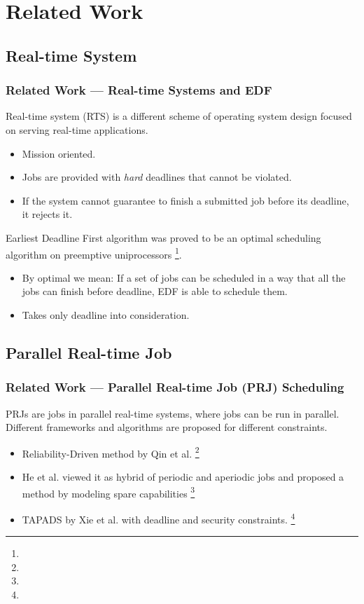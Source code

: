 \section{Related Work}
\subsection{Real-time System}
\begin{frame}
  \frametitle{Related Work --- Real-time Systems and EDF}
  Real-time system (RTS) is a different scheme of operating system
  design focused on serving real-time applications.
  \begin{itemize}
    \item Mission oriented.
    \item Jobs are provided with {\emph{hard}} deadlines that cannot be violated.
    \item If the system cannot guarantee to finish a submitted job
      before its deadline, it rejects it.
  \end{itemize}

  Earliest Deadline First algorithm was proved to be an optimal
  scheduling algorithm on preemptive uniprocessors
  \footnote[frame]{\tiny{}}.
  \begin{itemize}
    \item By optimal we mean: If a set of jobs can be scheduled in a way that all the jobs
      can finish before deadline, EDF is able to schedule them.
    \item Takes only deadline into consideration.
  \end{itemize}
\end{frame}
\subsection{Parallel Real-time Job}
\begin{frame}
  \frametitle{Related Work --- Parallel Real-time Job (PRJ) Scheduling}
  PRJs are jobs in parallel real-time systems, where jobs can be run in
  parallel.  Different frameworks and algorithms are proposed for
  different constraints.
  \begin{itemize}
    \item Reliability-Driven method by Qin et al.
      \footnote[frame]{\tiny{}}
    \item He et al. viewed it as hybrid of periodic and aperiodic jobs
      and proposed a method by modeling spare capabilities
      \footnote[frame]{\tiny{}}
    \item TAPADS by Xie et al. with deadline and security constraints.
      \footnote[frame]{\tiny{}}
  \end{itemize}
\end{frame}
